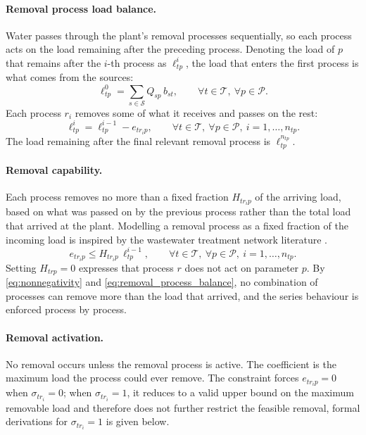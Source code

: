 \documentclass[10pt]{article}
\begin{document}
\paragraph{Removal process load balance.}
Water passes through the plant's removal processes sequentially, so each process acts on the load remaining after the preceding process.
Denoting the load of $p$ that remains after the $i$-th process as $\ell^i_{tp}$, the load that enters the first process is what comes from the sources:
\begin{equation}\label{eq:removal_process_initial}
    \ell^0_{tp} = \sum_{s \in \mathcal{S}}
    Q_{sp}\, b_{st}, \qquad \forall t \in \mathcal{T},\ \forall p \in \mathcal{P}.
\end{equation}
Each process $r_{i}$ removes some of what it receives and passes on the rest:
\begin{equation}\label{eq:removal_process_balance}
    \ell^i_{tp} = \ell^{i-1}_{tp} - e_{t r_i p},
    \qquad \forall t \in \mathcal{T},\ \forall p \in \mathcal{P},\ i = 1, \dots, n_{tp}.
\end{equation}
The load remaining after the final relevant removal process is  $\ell^{n_{tp}}_{tp}$.

\paragraph{Removal capability.}
Each process removes no more than a fixed fraction $H_{t r_i p}$ of the arriving load, based on what was passed on by the previous process rather than the total load that arrived at the plant.
Modelling a removal process as a fixed fraction of the incoming load is inspired by the wastewater treatment network literature \cite{castro2007, castro2009}.
\begin{equation}\label{eq:removal_capability}
    e_{t r_i p} \le H_{t r_i p}\, \ell^{i-1}_{tp},
    \qquad \forall t \in \mathcal{T},\ \forall p \in \mathcal{P},\ i = 1, \dots, n_{tp}.
\end{equation}
Setting $H_{trp} = 0$ expresses that process $r$ does not act on parameter $p$.
By \eqref{eq:nonnegativity} and \eqref{eq:removal_process_balance}, no combination of processes can remove more than the load that arrived, and the series behaviour is enforced process by process.

\paragraph{Removal activation.}
No removal occurs unless the removal process is active.
The coefficient is the maximum load the process could ever remove.
The constraint forces $e_{tr_ip}=0$ when $\sigma_{tr_i}=0$; when $\sigma_{tr_i}=1$, it reduces to a valid upper bound on the maximum removable load and therefore does not further restrict the feasible removal, formal derivations for $\sigma_{tr_i} = 1$ is given below.
\end{document}
